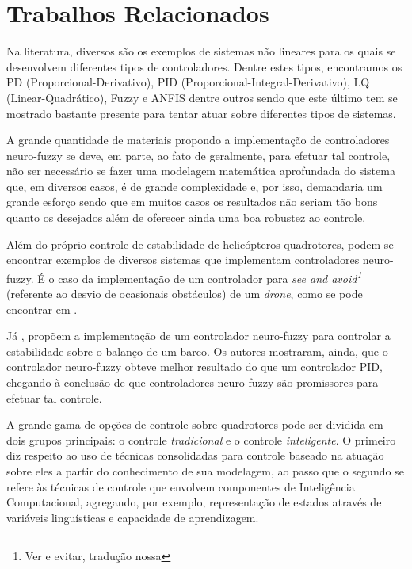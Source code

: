 %
%

\chapter{Trabalhos Relacionados}

Na literatura, diversos são os exemplos de sistemas não lineares para os quais se desenvolvem diferentes tipos de controladores. Dentre estes tipos, encontramos os PD (Proporcional-Derivativo), PID (Proporcional-Integral-Derivativo), LQ (Linear-Quadrático), Fuzzy e ANFIS dentre outros sendo que este último tem se mostrado bastante presente para tentar atuar sobre diferentes tipos de sistemas.

A grande quantidade de materiais propondo a implementação de controladores neuro-fuzzy se deve, em parte, ao fato de geralmente, para efetuar tal controle, não ser necessário se fazer uma modelagem matemática aprofundada do sistema que, em diversos casos, é de grande complexidade e, por isso, demandaria um grande esforço sendo que em muitos casos os resultados não seriam tão bons quanto os desejados além de oferecer ainda uma boa robustez ao controle.

Além do próprio controle de estabilidade de helicópteros quadrotores, podem-se encontrar exemplos de diversos sistemas que implementam controladores neuro-fuzzy. É o caso da implementação de um controlador para \textit{see and avoid\footnote{Ver e evitar, tradução nossa}} (referente ao desvio de ocasionais obstáculos) de um \textit{drone}, como se pode encontrar em .

Já , propõem a implementação de um controlador neuro-fuzzy para controlar a estabilidade sobre o balanço de um barco. Os autores mostraram, ainda, que o controlador neuro-fuzzy obteve melhor resultado do que um controlador PID, chegando à conclusão de que controladores neuro-fuzzy são promissores para efetuar tal controle.

A grande gama de opções de controle sobre quadrotores pode ser dividida em dois grupos principais: o controle \textit{tradicional} e o controle \textit{inteligente}. O primeiro diz respeito ao uso de técnicas consolidadas para controle baseado na atuação sobre eles a partir do conhecimento de sua modelagem, ao passo que o segundo se refere às técnicas de controle que envolvem componentes de Inteligência Computacional, agregando, por exemplo, representação de estados através de variáveis linguísticas e capacidade de aprendizagem.

